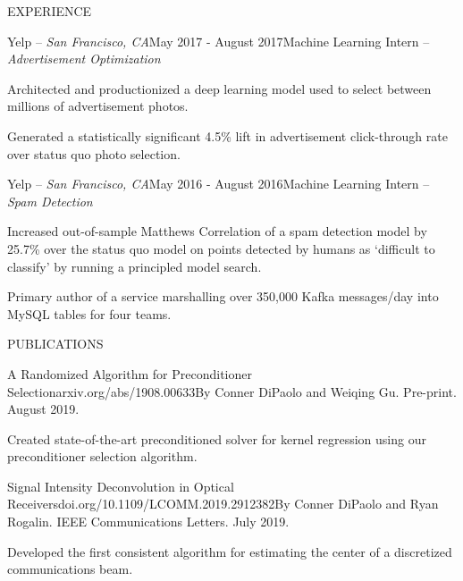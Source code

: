 \documentclass{resume} %
\begin{document}
\begin{rSection}{EXPERIENCE}
\begin{rSubsection}{Yelp -- {\it San Francisco, CA}}{May 2017 - August 2017}{Machine Learning Intern -- {\sl Advertisement Optimization}}

\item Architected and productionized a deep learning model used to select between millions of advertisement photos.
\item Generated a statistically significant 4.5\% lift in advertisement click-through rate over status quo photo selection.
\end{rSubsection}

\begin{rSubsection}{Yelp -- {\it San Francisco, CA}}{May 2016 - August 2016}{Machine Learning Intern -- {\sl Spam Detection}}

\item Increased out-of-sample Matthews Correlation of a spam detection model by 25.7\% over the status quo model on points detected by humans as `difficult to classify' by running a principled model search.
\item Primary author of a service marshalling over 350,000 Kafka messages/day into MySQL tables for four teams.
\end{rSubsection}

\vspace{-0.5em}
\end{rSection}


\begin{rSection}{PUBLICATIONS}

\begin{rSubsection}{A Randomized Algorithm for Preconditioner Selection}{\textsf{arxiv.org/abs/1908.00633}}{By Conner DiPaolo and Weiqing Gu. Pre-print. August 2019.}

\item Created state-of-the-art preconditioned solver for kernel regression using our preconditioner selection algorithm.
\end{rSubsection}

\begin{rSubsection}{Signal Intensity Deconvolution in Optical Receivers}{\textsf{doi.org/10.1109/LCOMM.2019.2912382}}{By Conner DiPaolo and Ryan Rogalin. IEEE Communications Letters. July 2019.}

\item Developed the first consistent algorithm for estimating the center of a discretized communications beam.

\end{rSubsection}

\vspace{-0.5em}
\end{rSection}
\end{document}
